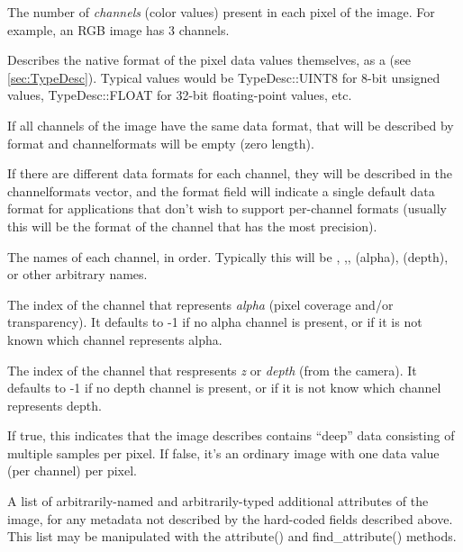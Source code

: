 The number of \emph{channels} (color values) present in each pixel of
the image.  For example, an RGB image has 3 channels.
\apiend


Describes the native format of the pixel data values themselves, as a
\TypeDesc (see \ref{sec:TypeDesc}).  Typical values would be 
{\cf TypeDesc::UINT8} for 8-bit unsigned values, {\cf TypeDesc::FLOAT}
for 32-bit floating-point values, etc.

If all channels of the image have the same data format, that will
be described by {\cf format} and {\cf channelformats} will be empty
(zero length).

If there are different data formats for each channel, they will be
described in the {\cf channelformats} vector, and the {\cf format} field
will indicate a single default data format for applications that don't
wish to support per-channel formats (usually this will be the format
of the channel that has the most precision).
\apiend

The names of each channel, in order.  Typically this will be ,
,,  (alpha),  (depth), or other arbitrary
names.
\apiend

The index of the channel that represents \emph{alpha} (pixel coverage
and/or transparency).  It defaults to -1 if no alpha channel is present,
or if it is not known which channel represents alpha.
\apiend

The index of the channel that respresents \emph{z} or \emph{depth} (from
the camera).  It defaults to -1 if no depth channel is present, or if it
is not know which channel represents depth.
\apiend

If {\cf true}, this indicates that the image describes contains ``deep''
data consisting of multiple samples per pixel.  If {\cf false}, it's an
ordinary image with one data value (per channel) per pixel.
\apiend

A list of arbitrarily-named and arbitrarily-typed additional attributes
of the image, for any metadata not described by the hard-coded fields
described above.  This list may be manipulated with the {\cf
attribute()} and {\cf find_attribute()} methods.
\apiend

